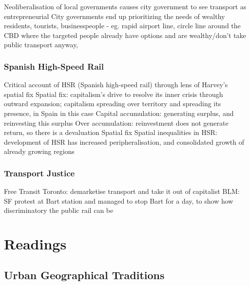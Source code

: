 \documentclass{article}
\begin{document}
\begin{outline}
	\1 Neoliberalisation of local governments causes city government to see transport as entrepreneurial
	\1 City governments end up prioritizing the needs of wealthy residents, tourists, businesspeople - eg. rapid airport line, circle line around the CBD where the targeted people already have options and are wealthy/don't take public transport anyway, 
\end{outline}

\subsubsection{Spanish High-Speed Rail}

\begin{outline}
	\1 Critical account of HSR (Spanish high-speed rail) through lens of Harvey's spatial fix
	\1 Spatial fix: capitalism's drive to resolve its inner crisis through outward expansion; capitalism spreading over territory and spreading its presence, in Spain in this case
		\2 Capital accumulation: generating surplus, and reinvesting this surplus
		\2 Over accumulation: reinvestment does not generate return, so there is a devaluation
		\2 Spatial fix
	\1 Spatial inequalities in HSR: development of HSR has increased peripheralisation, and consolidated growth of already growing regions
\end{outline}

\subsubsection{Transport Justice}

\begin{outline}
	\1 Free Transit Toronto: demarketise transport and take it out of capitalist 
	\1 BLM: SF protest at Bart station and managed to stop Bart for a day, to show how discriminatory the public rail can be
\end{outline}




\section{Readings}

\subsection{Urban Geographical Traditions}
\end{document}
